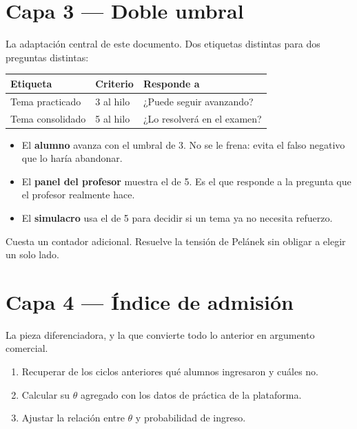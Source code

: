 \documentclass[11pt,a4paper]{article}
\begin{document}
\section{Capa 3 --- Doble umbral}

La adaptación central de este documento. Dos etiquetas distintas para dos preguntas distintas:

\begin{center}
\begin{tabular}{lll}
\toprule
\textbf{Etiqueta} & \textbf{Criterio} & \textbf{Responde a} \\
\midrule
Tema practicado & 3 al hilo & ¿Puede seguir avanzando? \\
Tema consolidado & 5 al hilo & ¿Lo resolverá en el examen? \\
\bottomrule
\end{tabular}
\end{center}

\vspace{6pt}

\begin{itemize}
\item El \textbf{alumno} avanza con el umbral de 3. No se le frena: evita el falso negativo que lo haría abandonar.
\item El \textbf{panel del profesor} muestra el de 5. Es el que responde a la pregunta que el profesor realmente hace.
\item El \textbf{simulacro} usa el de 5 para decidir si un tema ya no necesita refuerzo.
\end{itemize}

Cuesta un contador adicional. Resuelve la tensión de Pelánek sin obligar a elegir un solo lado.

\section{Capa 4 --- Índice de admisión}

La pieza diferenciadora, y la que convierte todo lo anterior en argumento comercial.

\begin{enumerate}
\item Recuperar de los ciclos anteriores qué alumnos ingresaron y cuáles no.
\item Calcular su $\theta$ agregado con los datos de práctica de la plataforma.
\item Ajustar la relación entre $\theta$ y probabilidad de ingreso.
\end{enumerate}
\end{document}
